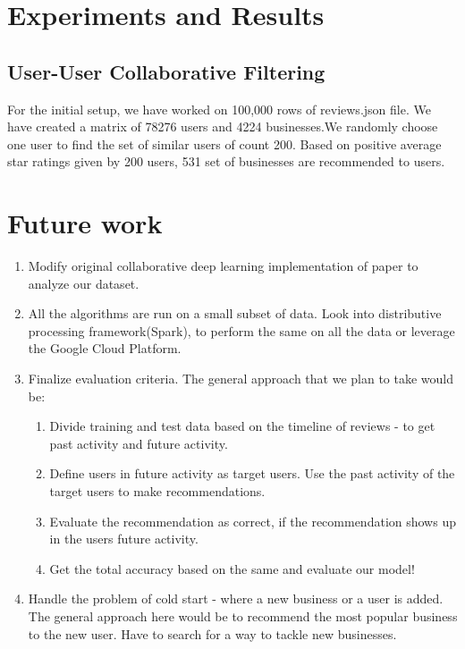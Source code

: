\documentclass[11pt]{article}
\begin{document}
	\section{Experiments and Results}
	
	\subsection{User-User Collaborative Filtering}

	For the initial setup, we have worked on 100,000 rows of reviews.json file. We have created a matrix of 78276 users and 4224 businesses.We randomly choose one user to find the set of similar users of count 200. Based on positive average star ratings given by 200 users, 531 set of businesses are recommended to users.
	
	
	
	\section{Future work}
	\begin{enumerate}
		\item Modify original collaborative deep learning implementation\cite{cdli} of paper \cite{cdl} to analyze our dataset.
		\item All the algorithms are run on a small subset of data. Look into distributive processing framework(Spark), to perform the same on all the data or leverage the Google Cloud Platform.
		\item Finalize evaluation criteria. The general approach that we plan to take would be:
		\begin{enumerate}
			\item Divide training and test data based on the timeline of reviews - to get past activity and future activity.
			\item Define users in future activity as target users. Use the past activity of the target users to make recommendations.
			\item Evaluate the recommendation as correct, if the recommendation shows up in the users future activity.
			\item Get the total accuracy based on the same and evaluate our model!
		\end{enumerate}
		\item Handle the problem of cold  start - where a new business or a user is added. The general approach here would be to recommend the most popular business to the new user. Have to search for a way to tackle new businesses.
		
	\end{enumerate}
	
\end{document}
